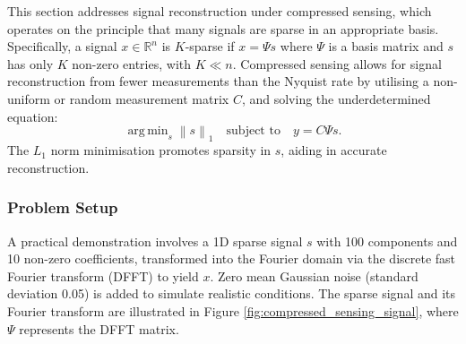 \documentclass[11pt]{article}
\DeclareMathOperator*{\argmin}{arg\,min}  %
\begin{document}
This section addresses signal reconstruction under compressed sensing, which operates on the principle that many signals are sparse in an appropriate basis. Specifically, a signal \( x \in \mathbb{R}^n \) is \( K \)-sparse if \( x = \Psi s \) where \( \Psi \) is a basis matrix and \( s \) has only \( K \) non-zero entries, with \( K \ll n \). Compressed sensing allows for signal reconstruction from fewer measurements than the Nyquist rate by utilising a non-uniform or random measurement matrix \( C \), and solving the underdetermined equation:
\[
\argmin_{s} \left\| s \right\|_1 \quad \text{subject to} \quad y = C \Psi s.
\]
The \( L_1 \) norm minimisation promotes sparsity in \( s \), aiding in accurate reconstruction.


\subsubsection{Problem Setup}
A practical demonstration involves a 1D sparse signal \( s \) with 100 components and 10 non-zero coefficients, transformed into the Fourier domain via the discrete fast Fourier transform (DFFT) to yield \( x \). Zero mean Gaussian noise (standard deviation 0.05) is added to simulate realistic conditions. The sparse signal and its Fourier transform are illustrated in Figure \ref{fig:compressed_sensing_signal}, where \( \Psi \) represents the DFFT matrix.
\end{document}
